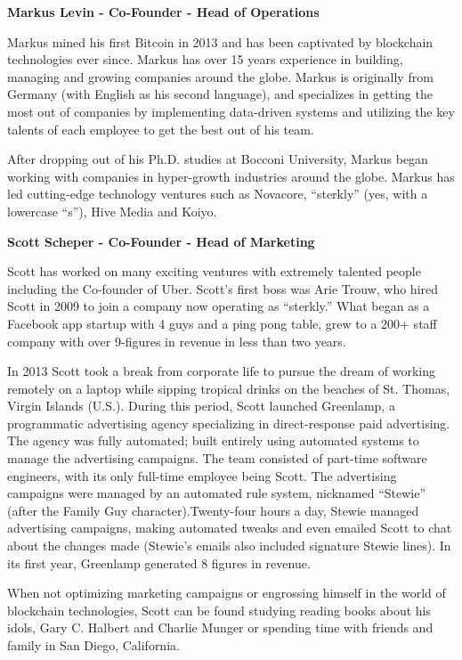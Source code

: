 \documentclass{article}
\begin{document}
\begin {framed}
\begin {center}
\textbf{Markus Levin - Co-Founder - Head of Operations}\par
\end {center}
Markus mined his first Bitcoin in 2013 and has been captivated by blockchain technologies ever since. Markus has over 15 years experience in building, managing and growing companies around the globe. Markus is originally from Germany (with English as his second language), and specializes in getting the most out of companies by implementing data-driven systems and utilizing the key talents of each employee to get the best out of his team.

After dropping out of his Ph.D. studies at Bocconi University, Markus began working with companies in hyper-growth industries around the globe. Markus has led cutting-edge technology ventures such as Novacore, ``sterkly'' (yes, with a lowercase ``s''), Hive Media and Koiyo.

\end {framed}

\begin {framed}
\begin {center}
\textbf{Scott Scheper - Co-Founder - Head of Marketing}\par
\end {center}
Scott has worked on many exciting ventures with extremely talented people including the Co-founder of Uber. Scott's first boss was Arie Trouw, who hired Scott in 2009 to join a company now operating as ``sterkly.'' What began as a Facebook app startup with 4 guys and a ping pong table, grew to a 200+ staff company with over 9-figures in revenue in less than two years.

In 2013 Scott took a break from corporate life to pursue the dream of working remotely on a laptop while sipping tropical drinks on the beaches of St. Thomas, Virgin Islands (U.S.). During this period, Scott launched Greenlamp, a programmatic advertising agency specializing in direct-response paid advertising. The agency was fully automated; built entirely using automated systems to manage the advertising campaigns. The team consisted of part-time software engineers, with its only full-time employee being Scott. The advertising campaigns were managed by an automated rule system, nicknamed ``Stewie'' (after the Family Guy character).Twenty-four hours a day, Stewie managed advertising campaigns, making automated tweaks and even emailed Scott to chat about the changes made (Stewie's emails also included signature Stewie lines). In its first year, Greenlamp generated 8 figures in revenue.

When not optimizing marketing campaigns or engrossing himself in the world of blockchain technologies, Scott can be found studying reading books about his idols, Gary C. Halbert and Charlie Munger or spending time with friends and family in San Diego, California.

\end {framed}
\end{document}
